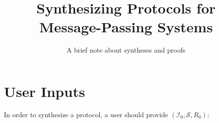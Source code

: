 \documentclass[format=manuscript]{acmart}
\begin{document}
\title{Synthesizing Protocols for Message-Passing Systems}
\subtitle{A brief note about syntheses and proofs}

\makeatletter
\renewcommand\@formatdoi[1]{\ignorespaces}
\makeatother

\maketitle


\newcommand{\todo}[1]{\textcolor{red}{TODO}: #1}

\newcommand{\valOf}[1]{\ensuremath{#1.\texttt{v}}}
\newcommand{\stOf}[1]{\ensuremath{#1.\texttt{st}}}
\newcommand{\trsOf}[1]{\ensuremath{#1.\texttt{trs}}}
\newcommand{\trsYes}{\ensuremath{\top}}
\newcommand{\trsNo}{\ensuremath{\bot}}

\newcommand{\objGetRq}[1]{\ensuremath{#1.\texttt{getRq()}}}
\newcommand{\objGetRs}[2]{\ensuremath{#1:\texttt{getRs(}#2\texttt{)}}}
\newcommand{\objSetRq}[2]{\ensuremath{#1.\texttt{setRq(}#2\texttt{)}}}
\newcommand{\objSetRs}[1]{\ensuremath{#1:\texttt{setRs()}}}

\newcommand{\intSetRq}[2]{\ensuremath{#1 \leadsto #2.\texttt{setRq()}}}
\newcommand{\intSetRs}[2]{\ensuremath{#1 \leadsto #2.\texttt{setRs()}}}
\newcommand{\intInvRq}[2]{\ensuremath{#1 \leadsto #2.\texttt{invRq()}}}
\newcommand{\intInvRs}[2]{\ensuremath{#1 \leadsto #2.\texttt{invRs()}}}

\newcommand{\msgrule}[4]{\ensuremath{#1\vdash \{ #2 \} \xrightarrow{#3} \{ #4 \}}}

\newcommand{\refSec}[1]{[Section~\ref{#1}]}
\newcommand{\refInv}[1]{[Invariant~\ref{#1}]}
\newcommand{\refTrs}[1]{[Transition~\ref{#1}]}
\newcommand{\refFig}[1]{[Figure~\ref{#1}]}

\newcommand{\eg}{\emph{e.g.}}
\newcommand{\ie}{\emph{i.e.}}

\section{User Inputs}

In order to synthesize a protocol, a user should provide $(\mathcal{I}_0,
\mathcal{S}, R_0)$:
\end{document}
